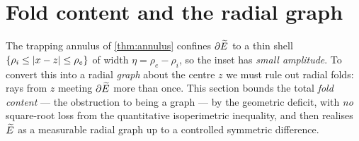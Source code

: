 \section{Fold content and the radial graph}\label{sec:fold}

The trapping annulus of \cref{thm:annulus} confines $\partial\widetilde{E}$ to a
thin shell $\{\rho_i\le\left\lvert x-z\right\rvert\le\rho_e\}$ of width $\eta=\rho_e-\rho_i$,
so the inset has \emph{small amplitude}. To convert this into a radial
\emph{graph} about the centre $z$ we must rule out radial folds: rays from
$z$ meeting $\partial\widetilde{E}$ more than once. This section bounds the total
\emph{fold content} --- the obstruction to being a graph --- by the
geometric deficit, with \emph{no} square-root loss from the quantitative
isoperimetric inequality, and then realises $\widetilde{E}$ as a measurable radial
graph up to a controlled symmetric difference.

